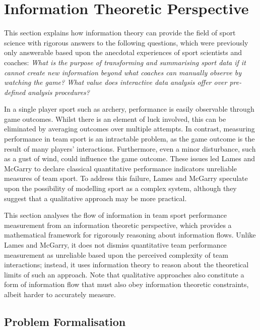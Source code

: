 \section{Information Theoretic Perspective}
\label{sec:info-theory-perspective}

This section explains how information theory can provide the field of sport
science with rigorous answers to the following questions, which were
previously only answerable based upon the anecdotal experiences of
sport scientists and coaches: \emph{What is the purpose of transforming
and summarising sport data if it cannot create new information beyond
what coaches can manually observe by watching the game? What value does
interactive data analysis offer over pre-defined analysis procedures?}

In a single player sport such as archery, performance is easily
observable through game outcomes. Whilst there is an element of luck
involved, this can be eliminated by averaging outcomes over multiple
attempts. In contrast, measuring performance in team sport is an
intractable problem, as the game outcome is the result of many players'
interactions. Furthermore, even a minor disturbance, such as a gust of
wind, could influence the game outcome. These issues led Lames and
McGarry \cite{lames2007search} to declare classical quantitative
performance indicators unreliable measures of team sport. To address
this failure, Lames and McGarry speculate upon the possibility of
modelling sport as a complex system, although they suggest that a qualitative
approach may be more practical.

This section analyses the flow of information in team sport performance measurement from an information theoretic
\cite{Shannon1948} perspective, which provides a
mathematical framework for rigorously reasoning about information flows.
Unlike Lames and McGarry, it does not dismiss quantitative team
performance measurement as unreliable based upon the perceived
complexity of team interactions; instead, it uses information theory to
reason about the theoretical limits of such an approach. Note that qualitative approaches also constitute a form of information flow that must also obey information theoretic constraints,
albeit harder to accurately measure.

\subsection{Problem Formalisation}\label{problem-formalization}

